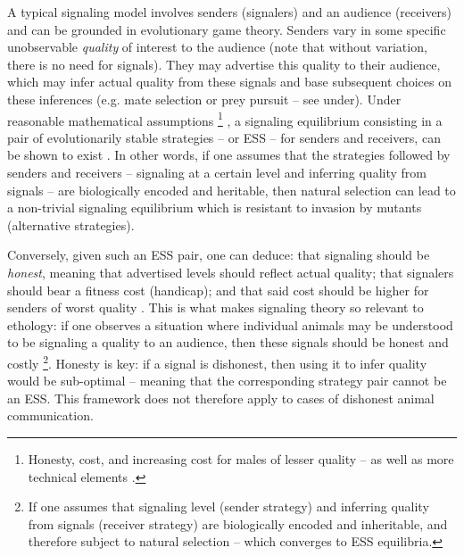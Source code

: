 \documentclass[a4paper,12pt]{report}
\begin{document}
A typical signaling model involves senders (signalers) and an audience
(receivers) and can be grounded in evolutionary game theory.
Senders vary in some specific unobservable \emph{quality} of interest to the audience
(note that without variation, there is no need for signals).
They may advertise this quality to their audience, which may infer actual quality
from these signals and base subsequent choices on these inferences
(e.g. mate selection or prey pursuit – see under). Under reasonable mathematical
assumptions
\footnote{Honesty, cost, and increasing cost for males of lesser quality –
as well as more technical elements \cite{grafen_biological_1990}.}
, a signaling equilibrium consisting in a pair of evolutionarily
stable strategies – or ESS \cite{maynard_smith_logic_1973}
– for senders and receivers, can be shown to exist \cite{grafen_biological_1990}.
In other words, if one assumes that the strategies followed by senders and receivers
– signaling at a certain level and inferring quality from signals –
are biologically encoded and heritable, then natural selection
can lead to a non-trivial signaling equilibrium which is resistant to
invasion by mutants (alternative strategies).


Conversely, given such an ESS pair, one can deduce: that signaling should be \emph{honest},
meaning that advertised levels should reflect actual quality; that signalers should
bear a fitness cost (handicap); and that said cost should be higher for senders
of worst quality \cite{grafen_biological_1990}. This is what makes signaling theory so relevant to
ethology: if one observes a situation where individual animals may be understood to
be signaling a quality to an audience, then these signals should be honest and costly
\footnote{If one assumes that signaling level (sender strategy) and inferring quality
from signals (receiver strategy) are biologically encoded and inheritable, 
and therefore subject to natural selection – which converges to ESS equilibria.}.
Honesty is key: if a signal is dishonest, then using it to infer quality would be
sub-optimal – meaning that the corresponding strategy pair cannot be an ESS.
This framework does not therefore apply to cases of dishonest animal communication.
\end{document}
